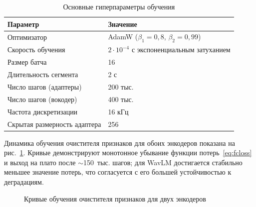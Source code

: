 \begin{table}[H]
    \caption{Основные гиперпараметры обучения}
    \label{tab:hparams}
    \centering
    \footnotesize
    \begin{tabularx}{\textwidth}{X l}
        \toprule
        Параметр & Значение \\
        \midrule
        Оптимизатор & AdamW ($\beta_1=0{,}8$, $\beta_2=0{,}99$) \\
        Скорость обучения & $2\cdot10^{-4}$ с экспоненциальным затуханием \\
        Размер батча & 16 \\
        Длительность сегмента & 2 с \\
        Число шагов (адаптеры) & 200 тыс. \\
        Число шагов (вокодер) & 400 тыс. \\
        Частота дискретизации & 16 кГц \\
        Скрытая размерность адаптера & 256 \\
        \bottomrule
    \end{tabularx}
\end{table}

Динамика обучения очистителя признаков для обоих энкодеров показана на
рис.~\ref{fig:trainloss}. Кривые демонстрируют монотонное убывание функции
потерь~\eqref{eq:fcloss} и выход на плато после $\sim$150~тыс. шагов; для WavLM
достигается стабильно меньшее значение потерь, что согласуется с его большей
устойчивостью к деградациям.

\begin{figure}[H]
    \centering
    \caption{Кривые обучения очистителя признаков для двух энкодеров}
    \label{fig:trainloss}
\end{figure}

